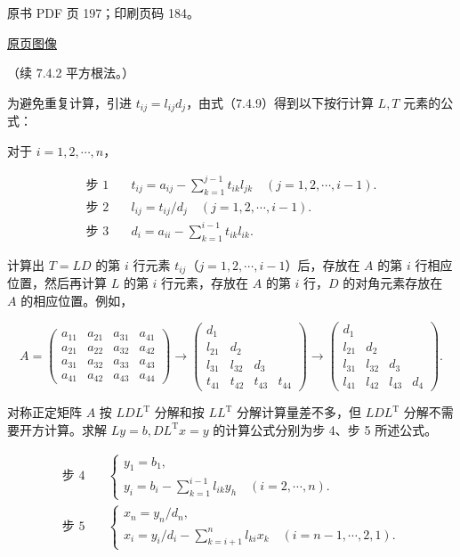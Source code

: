 \clearpage

原书 PDF 页 197；印刷页码 184。

\href{source-images/pdf-197.jpeg}{原页图像}

（续 7.4.2 平方根法。）

为避免重复计算，引进 \(t_{ij}=l_{ij}d_j\)，由式（7.4.9）得到以下按行计算 \(L,T\) 元素的公式：

对于 \(i=1,2,\cdots,n\)，

\[
\begin{aligned}
\text{步 1}\quad &t_{ij}=a_{ij}-\sum_{k=1}^{j-1}t_{ik}l_{jk}\quad(j=1,2,\cdots,i-1).\\
\text{步 2}\quad &l_{ij}=t_{ij}/d_j\quad(j=1,2,\cdots,i-1).\\
\text{步 3}\quad &d_i=a_{ii}-\sum_{k=1}^{i-1}t_{ik}l_{ik}.
\end{aligned}
\tag{7.4.10}
\]

计算出 \(T=LD\) 的第 \(i\) 行元素 \(t_{ij}\)（\(j=1,2,\cdots,i-1\)）后，存放在 \(A\) 的第 \(i\) 行相应位置，然后再计算 \(L\) 的第 \(i\) 行元素，存放在 \(A\) 的第 \(i\) 行，\(D\) 的对角元素存放在 \(A\) 的相应位置。例如，

\[
A=\begin{pmatrix}
a_{11}&a_{21}&a_{31}&a_{41}\\
a_{21}&a_{22}&a_{32}&a_{42}\\
a_{31}&a_{32}&a_{33}&a_{43}\\
a_{41}&a_{42}&a_{43}&a_{44}
\end{pmatrix}
\longrightarrow
\begin{pmatrix}
d_1&&&\\
l_{21}&d_2&&\\
l_{31}&l_{32}&d_3&\\
t_{41}&t_{42}&t_{43}&t_{44}
\end{pmatrix}
\longrightarrow
\begin{pmatrix}
d_1&&&\\
l_{21}&d_2&&\\
l_{31}&l_{32}&d_3&\\
l_{41}&l_{42}&l_{43}&d_4
\end{pmatrix}.
\]

对称正定矩阵 \(A\) 按 \(LDL^{\mathrm T}\) 分解和按 \(LL^{\mathrm T}\) 分解计算量差不多，但 \(LDL^{\mathrm T}\) 分解不需要开方计算。求解 \(Ly=b,DL^{\mathrm T}x=y\) 的计算公式分别为步 4、步 5 所述公式。

\[
\begin{aligned}
\text{步 4}\quad &\begin{cases}
y_1=b_1,\\
y_i=b_i-\displaystyle\sum_{k=1}^{i-1}l_{ik}y_h\quad(i=2,\cdots,n).
\end{cases}\\
\text{步 5}\quad &\begin{cases}
x_n=y_n/d_n,\\
x_i=y_i/d_i-\displaystyle\sum_{k=i+1}^{n}l_{ki}x_k\quad(i=n-1,\cdots,2,1).
\end{cases}
\end{aligned}
\tag{7.4.11}
\]

